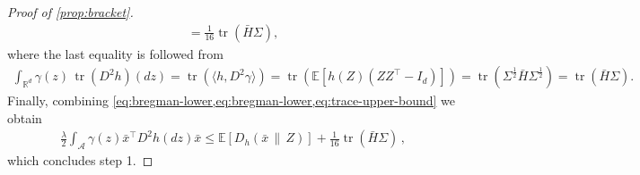 \documentclass{article}
\newcommand{\R}{\mathbb R}
\newcommand{\E}{\mathbb E}
\newcommand{\tr}{\operatorname{tr}}
\newcommand{\1}{\mathbf 1}
\begin{document}
\begin{proof}[Proof of \cref{prop:bracket}]
\begin{align}
        =
        \frac1{16}\tr(\bar{H}\Sigma),
        \label{eq:trace-upper-bound}
    \end{align}
    where the last equality is followed from
    \begin{align}
        \int_{\R^d}\gamma(z)\,\tr(D^2h)(dz)
        =
        \tr(\langle h, D^2\gamma\rangle)
        =
        \tr\left(\E\left[h(Z)(ZZ^\top-I_d)\right]\right)
        =
        \tr(\Sigma^{\frac12}\bar{H}\Sigma^{\frac12})
        =
        \tr(\bar{H}\Sigma).
        \label{eq:standardized-trace-curvature}
    \end{align}
    Finally, combining \cref{eq:bregman-lower,eq:bregman-lower,eq:trace-upper-bound} we obtain
    \begin{align}
        \frac\lambda2
        \int_{\mathcal A}
        \gamma(z)\bar{x}^\top D^2h(dz)\bar{x}
        \leq
        \E[D_h(\bar{x}\,\|\,Z)]
        +
        \frac1{16}\tr(\bar{H}\Sigma)\,,
        \label{eq:bracket-step1}
    \end{align}
    which concludes step 1.


\end{proof}
\end{document}
